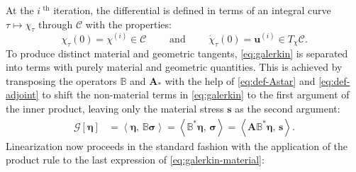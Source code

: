 At the \(i^{\text{ th}}\) iteration, the differential is
defined in terms of an integral curve
\(\tau \mapsto {\chi}_\tau\) through \(\mathscr{C}\) with
the properties:
%
\begin{equation}
\chi_{\tau}(0) = \chi^{(i)} \in \mathscr{C}
\qquad\text{ and }\qquad
  \dot{\chi}_\tau(0) %
  = \bm{u}^{(i)} \in T_\chi\mathscr{C}.
\label{eq:chi-curve}
\end{equation} 
To produce distinct material and geometric tangents,
\eqref{eq:galerkin} is 
separated into terms with %
purely material and geometric quantities.
This is achieved by %
transposing the operators \(\mathbb{B}\) and \(\bm{A}_*\)
with the help of %
\eqref{eq:def-Astar} and  \eqref{eq:def-adjoint}
to shift the %
non-material terms %
in \eqref{eq:galerkin} to the first argument of the inner product, leaving only the material stress \(\bm{s}\) as the second argument:
%
\begin{equation}
\begin{aligned}
\mathcal{G} [\bm{\eta}]
&= \left< \bm{\eta},\,  \mathbb{B} \bm{\sigma}\right>  = \left< \mathbb{B}^*_{} \bm{\eta}, \, \bm{\sigma}\right> = \left< \bm{A}\mathbb{B}^*_{} \bm{\eta}, \, \bm{s}\right>.
\end{aligned}
\label{eq:galerkin-material}
\end{equation}
Linearization now proceeds in the standard fashion with the application of the product rule to the last expression of \eqref{eq:galerkin-material}:

